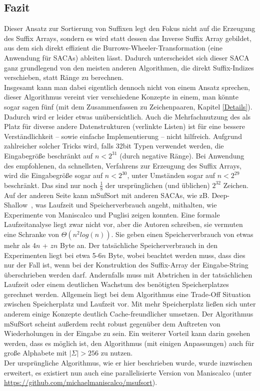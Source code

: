 \subsection{Fazit}

Dieser Ansatz zur Sortierung von Suffixen legt den Fokus nicht auf die Erzeugung des Suffix Arrays, sondern es wird statt dessen das Inverse Suffix Array gebildet, aus dem sich direkt effizient die Burrows-Wheeler-Transformation (eine Anwendung für SACAs) ableiten lässt.
Dadurch unterscheidet sich dieser SACA ganz grundlegend von den meisten anderen Algorithmen, die direkt Suffix-Indizes verschieben, statt Ränge zu berechnen.\\
Insgesamt kann man dabei eigentlich dennoch nicht von einem Ansatz sprechen, dieser Algorithmus vereint vier verschiedene Konzepte in einem, man könnte sogar sagen fünf (mit dem Zusammenfassen zu Zeichenpaaren, Kapitel \ref{Details}). Dadurch wird er leider etwas unübersichtlich. Auch die Mehrfachnutzung des \isa als Platz für diverse andere Datenstrukturen (verlinkte Listen) ist für eine bessere Verständlichkeit -- sowie einfache Implementierung -- nicht hilfreich. Aufgrund zahlreicher solcher Tricks wird, falls 32bit Typen verwendet werden, die Eingabegröße beschränkt auf $n < 2^{31}$ (durch negative Ränge). Bei Anwendung des empfohlenen, da schnellsten, Verfahrens zur Erzeugung des Suffix Arrays, wird die Eingabegröße sogar auf $n < 2^{30}$, unter Umständen sogar auf $n < 2^{29}$ beschränkt. Das sind nur noch $\frac{1}{8}$ der ursprünglichen (und üblichen) $2^{32}$ Zeichen.\\
Auf der anderen Seite kann mSufSort mit anderen SACAs, wie zB. Deep-Shallow~\cite{saca:4}, was Laufzeit und Speicherverbrauch angeht, mithalten, wie Experimente von Maniscalco und Puglisi zeigen konnten. Eine formale Laufzeitanalyse liegt zwar nicht vor, aber die Autoren schreiben, sie vermuten eine Schranke von $\Theta(n^2 log(n))$. Sie geben einen Speicherverbrauch von \glqq etwas mehr als\grqq{} 4$n$ + $zn$ Byte an. Der tatsächliche Speicherverbrauch in den Experimenten liegt bei etwa 5-6$n$ Byte, wobei beachtet werden muss, dass dies nur der Fall ist, wenn bei der Konstruktion des Suffix-Array der Eingabe-String überschrieben werden darf. Andernfalls muss mit Abstrichen in der tatsächlichen Laufzeit oder einem deutlichen Wachstum des benötigten Speicherplatzes gerechnet werden. Allgemein liegt bei dem Algorithmus eine Trade-Off Situation zwischen Speicherplatz und Laufzeit vor. Mit mehr Speicherplatz ließen sich unter anderem einige Konzepte deutlich Cache-freundlicher umsetzen.
Der Algorithmus mSufSort scheint außerdem recht robust gegenüber dem Auftreten von Wiederholungen in der Eingabe zu sein. Ein weiterer Vorteil kann darin gesehen werden, dass es möglich ist, den Algorithmus (mit einigen Anpassungen) auch für große Alphabete mit $|\Sigma| > 256$ zu nutzen.\\
Der ursprüngliche Algorithmus, wie er hier beschrieben wurde, wurde inzwischen erweitert, es existiert nun auch eine parallelisierte Version von Maniscalco (unter \url{https://github.com/michaelmaniscalco/msufsort}).

